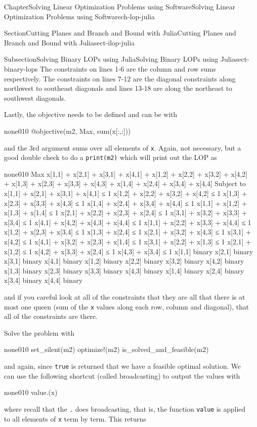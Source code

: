 \documentclass[oneside,10pt,]{book}
\newcommand{\mono}[1]{\texttt{#1}}
\numberwithin{equation}{section}
\begin{document}
\begin{chapterptx}{Chapter}{Solving Linear Optimization Problems using Software}{}{Solving Linear Optimization Problems using Software}{}{}{ch-lop-julia}
\begin{sectionptx}{Section}{Cutting Planes and Branch and Bound with Julia}{}{Cutting Planes and Branch and Bound with Julia}{}{}{sect-ilop-julia}
\begin{subsectionptx}{Subsection}{Solving Binary LOPs using Julia}{}{Solving Binary LOPs using Julia}{}{}{sect-binary-lops}
The constraints on lines 1-6 are the column and row sums respectively.  The constraints on lines 7-12 are the diagonal constraints along northwest to southeast diagonals and lines 13-18 are along the northeast to southwest diagonals.%
\par
Lastly, the objective needs to be defined and can be with%
\begin{program}{none}{0}{1}{0}
@objective(m2, Max, sum(x[:,:]))
\end{program}
and the 3rd argument sums over all elements of \mono{x}.  Again, not necessary, but a good double check to do a \mono{print(m2)} which will print out the LOP as%
\begin{program}{none}{0}{1}{0}
Max x[1,1] + x[2,1] + x[3,1] + x[4,1] + x[1,2] + x[2,2] + x[3,2] + x[4,2] + x[1,3] + x[2,3] + x[3,3] + x[4,3] + x[1,4] + x[2,4] + x[3,4] + x[4,4]
Subject to
 x[1,1] + x[2,1] + x[3,1] + x[4,1] ≤ 1
 x[1,2] + x[2,2] + x[3,2] + x[4,2] ≤ 1
 x[1,3] + x[2,3] + x[3,3] + x[4,3] ≤ 1
 x[1,4] + x[2,4] + x[3,4] + x[4,4] ≤ 1
 x[1,1] + x[1,2] + x[1,3] + x[1,4] ≤ 1
 x[2,1] + x[2,2] + x[2,3] + x[2,4] ≤ 1
 x[3,1] + x[3,2] + x[3,3] + x[3,4] ≤ 1
 x[4,1] + x[4,2] + x[4,3] + x[4,4] ≤ 1
 x[1,1] + x[2,2] + x[3,3] + x[4,4] ≤ 1
 x[1,2] + x[2,3] + x[3,4] ≤ 1
 x[1,3] + x[2,4] ≤ 1
 x[2,1] + x[3,2] + x[4,3] ≤ 1
 x[3,1] + x[4,2] ≤ 1
 x[4,1] + x[3,2] + x[2,3] + x[1,4] ≤ 1
 x[3,1] + x[2,2] + x[1,3] ≤ 1
 x[2,1] + x[1,2] ≤ 1
 x[4,2] + x[3,3] + x[2,4] ≤ 1
 x[4,3] + x[3,4] ≤ 1
 x[1,1] binary
 x[2,1] binary
 x[3,1] binary
 x[4,1] binary
 x[1,2] binary
 x[2,2] binary
 x[3,2] binary
 x[4,2] binary
 x[1,3] binary
 x[2,3] binary
 x[3,3] binary
 x[4,3] binary
 x[1,4] binary
 x[2,4] binary
 x[3,4] binary
 x[4,4] binary
\end{program}
and if you careful look at all of the constraints that they are all that there is at most one queen (sum of the \mono{x} values along each row, column and diagonal), that all of the constraints are there.%
\par
Solve the problem with%
\begin{program}{none}{0}{1}{0}
set_silent(m2)
optimize!(m2)
is_solved_and_feasible(m2)
\end{program}
and again, since \mono{true} is returned that we have a feasible optimal solution.  We can use the following shortcut (called broadcasting) to output the values with%
\begin{program}{none}{0}{1}{0}
value.(x)
\end{program}
where recall that the \mono{.} does broadcasting, that is, the function \mono{value} is applied to all elements of \mono{x} term by term.  This returns%

\end{subsectionptx}
\end{sectionptx}
\end{chapterptx}
\end{document}
